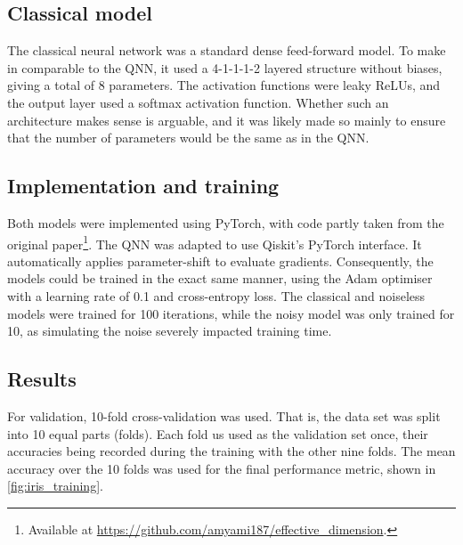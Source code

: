 \subsection{Classical model}
The classical neural network was a standard dense feed-forward model.
To make in comparable to the QNN, it used a 4-1-1-1-2 layered structure without biases, giving a total of 8 parameters.
The activation functions were leaky ReLUs, and the output layer used a softmax activation function.
Whether such an architecture makes sense is arguable, and it was likely made so mainly to ensure that the number of parameters would be the same as in the QNN.


\subsection{Implementation and training}
Both models were implemented using PyTorch, with code partly taken from the original paper\footnote{Available at \url{https://github.com/amyami187/effective_dimension}.}.
The QNN was adapted to use Qiskit's PyTorch interface.
It automatically applies parameter-shift to evaluate gradients.
Consequently, the models could be trained in the exact same manner, using the Adam optimiser with a learning rate of 0.1 and cross-entropy loss.
The classical and noiseless models were trained for 100 iterations, while the noisy model was only trained for 10, as simulating the noise severely impacted training time.

\subsection{Results}
For validation, 10-fold cross-validation was used.
That is, the data set was split into 10 equal parts (folds).
Each fold us used as the validation set once, their accuracies being recorded during the training with the other nine folds.
The mean accuracy over the 10 folds was used for the final performance metric, shown in \cref{fig:iris_training}.

